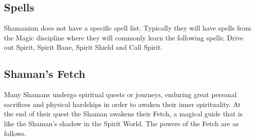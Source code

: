 \subsection{Spells}
Shamanism does not have a specific spell list. Typically they will have spells from the Magic discipline where they will commonly learn the following spells; Drive out Spirit, Spirit Bane, Spirit Shield and Call Spirit.


\subsection{Shaman's Fetch}
Many Shamans undergo spiritual quests or journeys, enduring great personal sacrifices and physical hardships in order to awaken their inner spirituality. At the end of their quest the Shaman awakens their Fetch, a magical guide that is like the Shaman’s shadow in the Spirit World. The powers of the Fetch are as follows.
